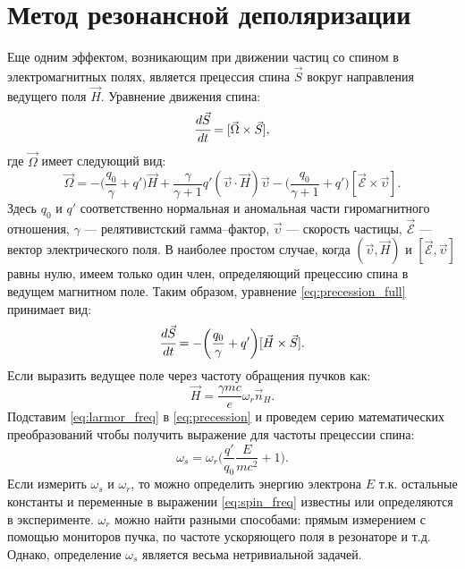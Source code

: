 \section{Метод резонансной деполяризации}
Еще одним эффектом, возникающим при движении частиц со спином в электромагнитных полях, является прецессия спина $\vec{S}$ вокруг направления ведущего поля $\vec{H}$. Уравнение движения спина:
\begin{equation}
\cfrac{d\vec{S}}{dt} = [\vec{\Omega} \times \vec{S}],
\label{eq:precession_full}
\end{equation}
где $\vec{\Omega}$ имеет следующий вид:
\begin{equation}
\vec{\Omega} = -\biggl(\frac{q_0}{\gamma}+q'\biggr) \vec{H} + \frac{\gamma}{\gamma + 1}q' (\vec{\upsilon} \cdot \vec{H})\vec{\upsilon}- \biggl(\frac{q_0}{\gamma+1}  + q'\biggr)[\vec{\mathcal{E}} \times \vec{\upsilon}].
\end{equation}%
Здесь $q_0$ и $q'$ соответственно нормальная и аномальная части гиромагнитного отношения, $\gamma$ --- релятивистский гамма--фактор, $\vec{\upsilon}$ --- скорость частицы, $\vec{\mathcal{E}}$ --- вектор электрического поля.
В наиболее простом случае, когда $(\vec{\upsilon}, \vec{H})$ и $[\vec{\mathcal{E}},\vec{\upsilon}]$ равны нулю, имеем только один член, определяющий прецессию спина в ведущем магнитном поле. Таким образом, уравнение \ref{eq:precession_full} принимает вид:
\begin{equation}
\cfrac{d\vec{S}}{dt} = -\biggl(\frac{q_0}{\gamma}+q'\biggr) [\vec{H} \times \vec{S}].
\label{eq:precession}
\end{equation}%
Если выразить ведущее поле через частоту обращения пучков как: 
\begin{equation}
\vec{H} = \frac {\gamma mc}{e}\omega_r\vec{n}_H.
\label{eq:larmor_freq}
\end{equation}
Подставим \ref{eq:larmor_freq} в \ref{eq:precession} и проведем серию математических преобразований чтобы получить выражение для частоты прецессии спина:
\begin{equation}
\omega_s=  \omega_{r}\bigg(\frac{q'}{q_0}\frac{E}{mc^2}+1\bigg).
\label{eq:spin_freq}
\end{equation}
Если измерить $\omega_s$ и $\omega_{r}$, то можно определить энергию электрона $E$ т.к. остальные константы и переменные в выражении \ref{eq:spin_freq} известны или определяются в эксперименте. $\omega_{r}$ можно найти разными способами: прямым измерением с помощью мониторов пучка, по частоте ускоряющего поля в резонаторе и т.д. Однако, определение $\omega_s$ является весьма нетривиальной задачей. 
